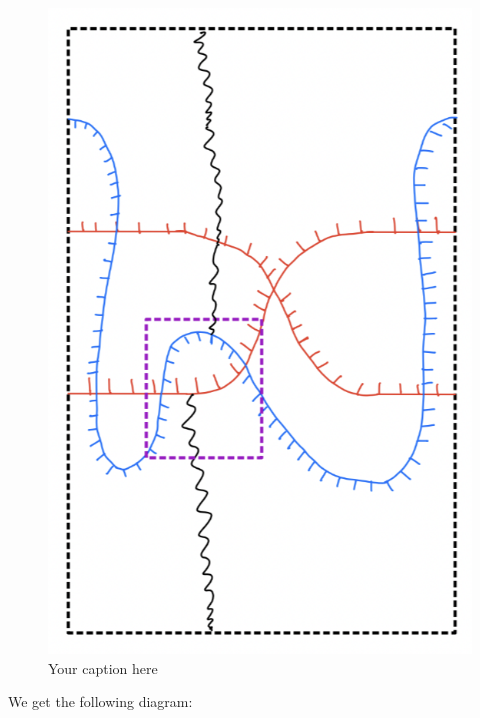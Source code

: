 \begin{figure}[H] %
    \centering
    \includegraphics[scale = 0.95]{diagrams/lemma10/11.png} %
    \caption{Your caption here}
    \label{fig:your-label}
\end{figure}

We get the following diagram:


